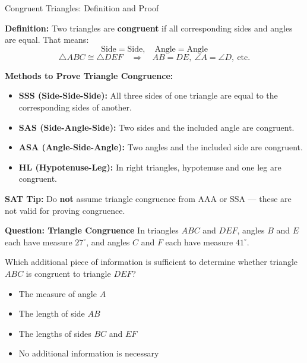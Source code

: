 \documentclass{beamer}
\begin{document}
\begin{frame}{Congruent Triangles: Definition and Proof }
\small

\textbf{Definition:}  
Two triangles are \textbf{congruent} if all corresponding sides and angles are equal. That means:
\[
\text{Side} = \text{Side},\quad \text{Angle} = \text{Angle}
\]
\[
\triangle ABC \cong \triangle DEF \quad \Rightarrow \quad AB = DE,\ \angle A = \angle D,\ \text{etc.}
\]

\vspace{0.3cm}
\textbf{Methods to Prove Triangle Congruence:}
\begin{itemize}
    \item \textbf{SSS (Side-Side-Side):} All three sides of one triangle are equal to the corresponding sides of another.
    \item \textbf{SAS (Side-Angle-Side):} Two sides and the included angle are congruent.
    \item \textbf{ASA (Angle-Side-Angle):} Two angles and the included side are congruent.

    \item \textbf{HL (Hypotenuse-Leg):} In right triangles, hypotenuse and one leg are congruent.
\end{itemize}

\vspace{0.2cm}
\textbf{SAT Tip:}  
Do \textbf{not} assume triangle congruence from AAA or SSA — these are not valid for proving congruence.

\end{frame}



\begin{frame}{\textbf{Question: Triangle Congruence}}
In triangles \( ABC \) and \( DEF \), angles \( B \) and \( E \) each have measure \( 27^\circ \), and angles \( C \) and \( F \) each have measure \( 41^\circ \). 

Which additional piece of information is sufficient to determine whether triangle \( ABC \) is congruent to triangle \( DEF \)?

\begin{itemize}
    \item[A.] The measure of angle \( A \)
    \item[B.] The length of side \( AB \)
    \item[C.] The lengths of sides \( BC \) and \( EF \)
    \item[D.] No additional information is necessary
\end{itemize}
\end{frame}
\end{document}
